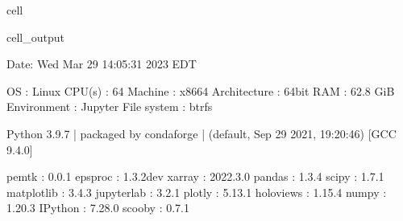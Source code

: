 \documentclass[letterpaper,table,10pt,english]{jupyterBook}
\begin{document}
\begin{sphinxuseclass}{cell}
\begin{sphinxVerbatimOutput}
\begin{sphinxuseclass}{cell_output}
\begin{sphinxVerbatim}[commandchars=\\\{\}]
\PYGZhy{}\PYGZhy{}\PYGZhy{}\PYGZhy{}\PYGZhy{}\PYGZhy{}\PYGZhy{}\PYGZhy{}\PYGZhy{}\PYGZhy{}\PYGZhy{}\PYGZhy{}\PYGZhy{}\PYGZhy{}\PYGZhy{}\PYGZhy{}\PYGZhy{}\PYGZhy{}\PYGZhy{}\PYGZhy{}\PYGZhy{}\PYGZhy{}\PYGZhy{}\PYGZhy{}\PYGZhy{}\PYGZhy{}\PYGZhy{}\PYGZhy{}\PYGZhy{}\PYGZhy{}\PYGZhy{}\PYGZhy{}\PYGZhy{}\PYGZhy{}\PYGZhy{}\PYGZhy{}\PYGZhy{}\PYGZhy{}\PYGZhy{}\PYGZhy{}\PYGZhy{}\PYGZhy{}\PYGZhy{}\PYGZhy{}\PYGZhy{}\PYGZhy{}\PYGZhy{}\PYGZhy{}\PYGZhy{}\PYGZhy{}\PYGZhy{}\PYGZhy{}\PYGZhy{}\PYGZhy{}\PYGZhy{}\PYGZhy{}\PYGZhy{}\PYGZhy{}\PYGZhy{}\PYGZhy{}\PYGZhy{}\PYGZhy{}\PYGZhy{}\PYGZhy{}\PYGZhy{}\PYGZhy{}\PYGZhy{}\PYGZhy{}\PYGZhy{}\PYGZhy{}\PYGZhy{}\PYGZhy{}\PYGZhy{}\PYGZhy{}\PYGZhy{}\PYGZhy{}\PYGZhy{}\PYGZhy{}\PYGZhy{}\PYGZhy{}
  Date: Wed Mar 29 14:05:31 2023 EDT

                OS : Linux
            CPU(s) : 64
           Machine : x86\PYGZus{}64
      Architecture : 64bit
               RAM : 62.8 GiB
       Environment : Jupyter
       File system : btrfs

  Python 3.9.7 | packaged by conda\PYGZhy{}forge | (default, Sep 29 2021, 19:20:46)
  [GCC 9.4.0]

             pemtk : 0.0.1
           epsproc : 1.3.2\PYGZhy{}dev
            xarray : 2022.3.0
            pandas : 1.3.4
             scipy : 1.7.1
        matplotlib : 3.4.3
        jupyterlab : 3.2.1
            plotly : 5.13.1
         holoviews : 1.15.4
             numpy : 1.20.3
           IPython : 7.28.0
            scooby : 0.7.1
\PYGZhy{}\PYGZhy{}\PYGZhy{}\PYGZhy{}\PYGZhy{}\PYGZhy{}\PYGZhy{}\PYGZhy{}\PYGZhy{}\PYGZhy{}\PYGZhy{}\PYGZhy{}\PYGZhy{}\PYGZhy{}\PYGZhy{}\PYGZhy{}\PYGZhy{}\PYGZhy{}\PYGZhy{}\PYGZhy{}\PYGZhy{}\PYGZhy{}\PYGZhy{}\PYGZhy{}\PYGZhy{}\PYGZhy{}\PYGZhy{}\PYGZhy{}\PYGZhy{}\PYGZhy{}\PYGZhy{}\PYGZhy{}\PYGZhy{}\PYGZhy{}\PYGZhy{}\PYGZhy{}\PYGZhy{}\PYGZhy{}\PYGZhy{}\PYGZhy{}\PYGZhy{}\PYGZhy{}\PYGZhy{}\PYGZhy{}\PYGZhy{}\PYGZhy{}\PYGZhy{}\PYGZhy{}\PYGZhy{}\PYGZhy{}\PYGZhy{}\PYGZhy{}\PYGZhy{}\PYGZhy{}\PYGZhy{}\PYGZhy{}\PYGZhy{}\PYGZhy{}\PYGZhy{}\PYGZhy{}\PYGZhy{}\PYGZhy{}\PYGZhy{}\PYGZhy{}\PYGZhy{}\PYGZhy{}\PYGZhy{}\PYGZhy{}\PYGZhy{}\PYGZhy{}\PYGZhy{}\PYGZhy{}\PYGZhy{}\PYGZhy{}\PYGZhy{}\PYGZhy{}\PYGZhy{}\PYGZhy{}\PYGZhy{}\PYGZhy{}
\end{sphinxVerbatim}

\end{sphinxuseclass}\end{sphinxVerbatimOutput}

\end{sphinxuseclass}
\end{document}

